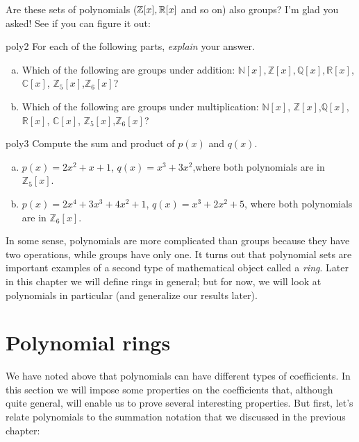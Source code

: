Are these sets of polynomials ($\mathbb{Z}[x], \mathbb{R}[x]$ and so on) also groups? I'm glad you asked! See if you can figure it out:

\begin{exercise}{poly2}
For each of the following parts, \emph{explain} your answer. 
\begin{enumerate}[(a)]
\item
Which of the following are groups under addition: $\mathbb{N}[x], \mathbb{Z}[x], \mathbb{Q}[x], \mathbb{R}[x]$, $\mathbb{C}[x]$, $\mathbb{Z}_5[x]$,$\mathbb{Z}_6[x]$? 
\item
Which of the following are groups under multiplication: $\mathbb{N}[x]$, $\mathbb{Z}[x]$,$\mathbb{Q}[x]$,$\mathbb{R}[x]$, $\mathbb{C}[x]$, $\mathbb{Z}_5[x]$,$\mathbb{Z}_6[x]$? 

\end{enumerate}
\end{exercise}

\begin{exercise}{poly3}
Compute the sum and product of $p(x)$ and $q(x)$.
\begin{enumerate}[(a)]
\item
$p(x)= 2x^2 + x + 1$, $q(x)=x^3 +3x^2$,where both polynomials are in $\mathbb{Z}_5[x]$.
\item
$p(x)= 2x^4 + 3x^3 + 4x^2+1$, $q(x)=x^3 +2x^2+5$, where both polynomials are in $\mathbb{Z}_6[x]$.
\end{enumerate}
\end{exercise}

In some sense, polynomials are more complicated than groups because they have two operations, while groups have only one. It turns out that polynomial sets are important examples of a second type of mathematical object called a \emph{ring}. Later in this chapter we will define rings in general; but for now, we will look at polynomials in particular (and generalize our results later).

\section {Polynomial rings}
 We have noted above that polynomials can have different types of coefficients. 
In this section we will  impose some properties on the coefficients that, although quite general, will enable us to prove several interesting properties. But first, let's relate polynomials to the summation notation that we discussed in the previous chapter:

